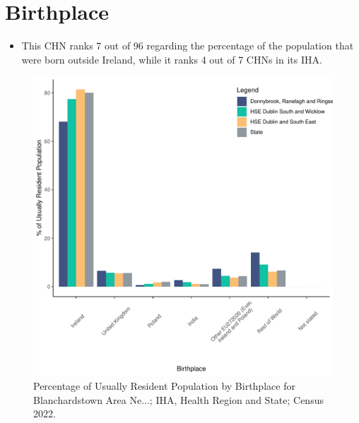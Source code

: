 \documentclass{article}
\begin{document}
\section{Birthplace}\label{sect:Birth}
\begin{itemize}
\item This CHN ranks  7 out of 96 regarding the percentage of the population that were born outside Ireland, while it ranks  4 out of 7 CHNs in its IHA.
\end{itemize}
\begin{figure}[H]
	\centering
	\includegraphics[width = 130mm]{../figures/BirthED.pdf}
	\caption{Percentage of Usually Resident Population by Birthplace for Blanchardstown Area Ne...; IHA, Health Region and State; Census 2022.}
	\label{fig:vbnv}
	\end{figure}
	
\end{document}
